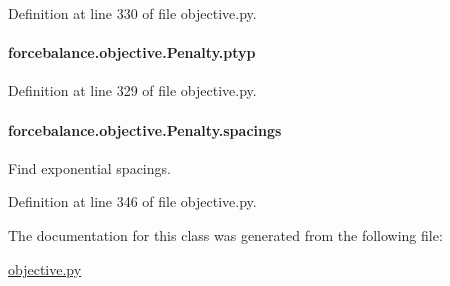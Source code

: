 Definition at line 330 of file objective.\-py.

\hypertarget{classforcebalance_1_1objective_1_1Penalty_aafed9613564329fc6a760aec26a43116}{
\paragraph[{ptyp}]{\setlength{\rightskip}{0pt plus 5cm}forcebalance.\-objective.\-Penalty.\-ptyp}}\label{classforcebalance_1_1objective_1_1Penalty_aafed9613564329fc6a760aec26a43116}


Definition at line 329 of file objective.\-py.

\hypertarget{classforcebalance_1_1objective_1_1Penalty_a9832c430eccb9edf404ba12ed2f54541}{
\paragraph[{spacings}]{\setlength{\rightskip}{0pt plus 5cm}forcebalance.\-objective.\-Penalty.\-spacings}}\label{classforcebalance_1_1objective_1_1Penalty_a9832c430eccb9edf404ba12ed2f54541}


Find exponential spacings. 



Definition at line 346 of file objective.\-py.



The documentation for this class was generated from the following file\-:\begin{DoxyCompactItemize}
\item 
\hyperlink{objective_8py}{objective.\-py}\end{DoxyCompactItemize}
